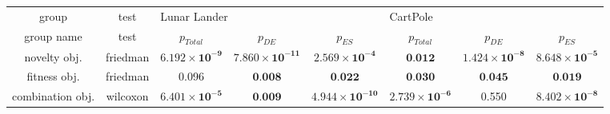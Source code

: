\begin{tabular}{cc|ccc|ccc}
\toprule
           group &     test & \multicolumn{3}{l}{Lunar Lander} & \multicolumn{3}{l}{CartPole} \\
      group name &     test &                     $p_{Total}$ &                         $p_{DE}$ &                         $p_{ES}$ &                     $p_{Total}$ &                        $p_{DE}$ &                        $p_{ES}$ \\
\midrule
    novelty obj. & friedman & $\mathbf{6.192 \times 10^{-9}}$ & $\mathbf{7.860 \times 10^{-11}}$ &  $\mathbf{2.569 \times 10^{-4}}$ &                $\textbf{0.012}$ & $\mathbf{1.424 \times 10^{-8}}$ & $\mathbf{8.648 \times 10^{-5}}$ \\
    fitness obj. & friedman &                           0.096 &                 $\textbf{0.008}$ &                 $\textbf{0.022}$ &                $\textbf{0.030}$ &                $\textbf{0.045}$ &                $\textbf{0.019}$ \\
combination obj. & wilcoxon & $\mathbf{6.401 \times 10^{-5}}$ &                 $\textbf{0.009}$ & $\mathbf{4.944 \times 10^{-10}}$ & $\mathbf{2.739 \times 10^{-6}}$ &                           0.550 & $\mathbf{8.402 \times 10^{-8}}$ \\
\bottomrule
\end{tabular}
